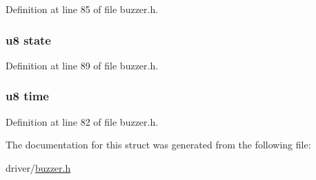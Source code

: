 \-Definition at line 85 of file buzzer.\-h.

\hypertarget{structbuzzer_ad0bc4e4e6e6ffc52d9079b73afd73887}{
\subsubsection[{state}]{\setlength{\rightskip}{0pt plus 5cm}u8 {\bf state}}}\label{structbuzzer_ad0bc4e4e6e6ffc52d9079b73afd73887}


\-Definition at line 89 of file buzzer.\-h.

\hypertarget{structbuzzer_a71f347517c3a3ac0fce4cab20925eb10}{
\subsubsection[{time}]{\setlength{\rightskip}{0pt plus 5cm}u8 {\bf time}}}\label{structbuzzer_a71f347517c3a3ac0fce4cab20925eb10}


\-Definition at line 82 of file buzzer.\-h.



\-The documentation for this struct was generated from the following file\-:\begin{DoxyCompactItemize}
\item 
driver/\hyperlink{buzzer_8h}{buzzer.\-h}\end{DoxyCompactItemize}
